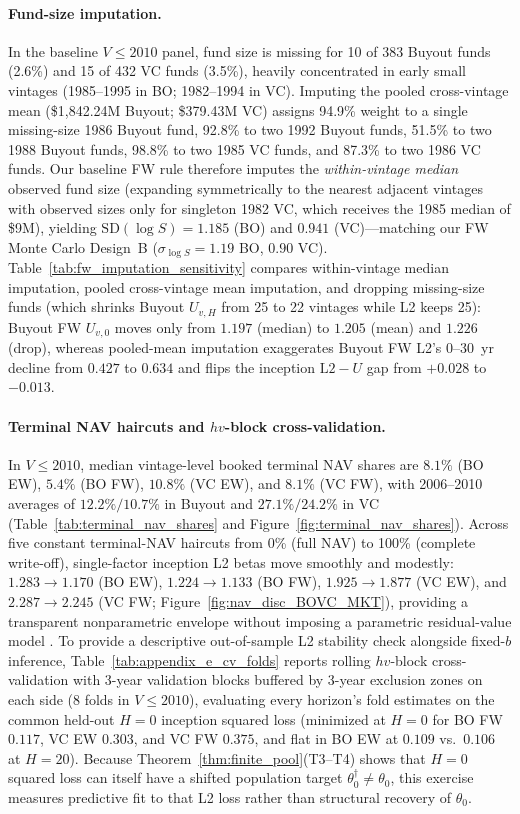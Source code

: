 \paragraph{Fund-size imputation.}
In the baseline $V \le 2010$ panel, fund size is missing for 10 of 383 Buyout funds (2.6\%) and 15 of 432 VC funds (3.5\%), heavily concentrated in early small vintages (1985--1995 in BO; 1982--1994 in VC).
Imputing the pooled cross-vintage mean (\$1{,}842.24M Buyout; \$379.43M VC) assigns 94.9\% weight to a single missing-size 1986 Buyout fund, 92.8\% to two 1992 Buyout funds, 51.5\% to two 1988 Buyout funds, 98.8\% to two 1985 VC funds, and 87.3\% to two 1986 VC funds.
Our baseline FW rule therefore imputes the \emph{within-vintage median} observed fund size (expanding symmetrically to the nearest adjacent vintages with observed sizes only for singleton 1982 VC, which receives the 1985 median of \$9M), yielding $\mathrm{SD}(\log S) = 1.185$ (BO) and $0.941$ (VC)---matching our FW Monte Carlo Design~B ($\sigma_{\log S} = 1.19$ BO, $0.90$ VC).
Table~\ref{tab:fw_imputation_sensitivity} compares within-vintage median imputation, pooled cross-vintage mean imputation, and dropping missing-size funds (which shrinks Buyout $U_{v,H}$ from 25 to 22 vintages while L2 keeps 25): Buyout FW $U_{v,0}$ moves only from $1.197$ (median) to $1.205$ (mean) and $1.226$ (drop), whereas pooled-mean imputation exaggerates Buyout FW L2's 0--30~yr decline from $0.427$ to $0.634$ and flips the inception $\mathrm{L2}-U$ gap from $+0.028$ to $-0.013$.

\paragraph{Terminal NAV haircuts and $hv$-block cross-validation.}
In $V \le 2010$, median vintage-level booked terminal NAV shares are $8.1\%$ (BO EW), $5.4\%$ (BO FW), $10.8\%$ (VC EW), and $8.1\%$ (VC FW), with 2006--2010 averages of $12.2\%/10.7\%$ in Buyout and $27.1\%/24.2\%$ in VC (Table~\ref{tab:terminal_nav_shares} and Figure~\ref{fig:terminal_nav_shares}).
Across five constant terminal-NAV haircuts from 0\% (full NAV) to 100\% (complete write-off), single-factor inception L2 betas move smoothly and modestly: $1.283 \to 1.170$ (BO EW), $1.224 \to 1.133$ (BO FW), $1.925 \to 1.877$ (VC EW), and $2.287 \to 2.245$ (VC FW; Figure~\ref{fig:nav_disc_BOVC_MKT}), providing a transparent nonparametric envelope without imposing a parametric residual-value model \citep{JLRS20,brown2023nowcasting}.
To provide a descriptive out-of-sample L2 stability check alongside fixed-$b$ inference, Table~\ref{tab:appendix_e_cv_folds} reports rolling $hv$-block cross-validation \citep{R00} with 3-year validation blocks buffered by 3-year exclusion zones on each side (8 folds in $V \le 2010$), evaluating every horizon's fold estimates on the common held-out $H=0$ inception squared loss (minimized at $H=0$ for BO FW $0.117$, VC EW $0.303$, and VC FW $0.375$, and flat in BO EW at $0.109$ vs.\ $0.106$ at $H=20$). Because Theorem~\ref{thm:finite_pool}(T3--T4) shows that $H=0$ squared loss can itself have a shifted population target $\theta_0^\dagger \neq \theta_0$, this exercise measures predictive fit to that L2 loss rather than structural recovery of $\theta_0$.

